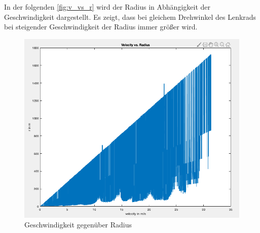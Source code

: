 	In der folgenden \autoref{fig:v_vs_r} wird der Radius in Abhängigkeit der Geschwindigkeit dargestellt. Es zeigt, dass bei gleichem Drehwinkel des Lenkrads bei steigender Geschwindigkeit der Radius immer größer wird. 
	\begin{figure}[h!]
		\centering
		\includegraphics[width=1\linewidth]{../Graphiken/v_vs_r}
		\caption{Geschwindigkeit gegenüber Radius}
		\label{fig:v_vs_r}
	\end{figure}



	
	

	
	
	
	